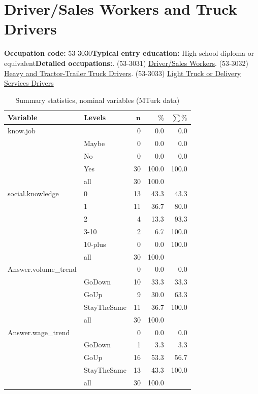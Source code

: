 \documentclass[a4paper,10pt]{article}\usepackage[]{graphicx}\usepackage[]{color}
\begin{document}
\newpage\section{Driver/Sales Workers and Truck Drivers}\textbf{Occupation code:} 53-3030\newline\textbf{Typical entry education:} High school diploma or equivalent\newline\textbf{Detailed occupations:}. (53-3031)  \href{http://www.bls.gov/oes/current/oes533031.htm}{Driver/Sales Workers}. (53-3032)  \href{http://www.bls.gov/oes/current/oes533032.htm}{Heavy and Tractor-Trailer Truck Drivers}. (53-3033)  \href{http://www.bls.gov/oes/current/oes533033.htm}{Light Truck or Delivery Services Drivers}\newline%
\begin{table}[ht]
\centering
{\footnotesize
\begin{tabular}{ll|rrr}
 \textbf{Variable} & \textbf{Levels} & $\mathbf{n}$ & $\mathbf{\%}$ & $\mathbf{\sum \%}$ \\ 
  \hline
know.job &  & 0 & 0.0 & 0.0 \\ 
   & Maybe & 0 & 0.0 & 0.0 \\ 
   & No & 0 & 0.0 & 0.0 \\ 
   & Yes & 30 & 100.0 & 100.0 \\ 
   \hline
 & all & 30 & 100.0 &  \\ 
   \hline
\hline
social.knowledge & 0 & 13 & 43.3 & 43.3 \\ 
   & 1 & 11 & 36.7 & 80.0 \\ 
   & 2 & 4 & 13.3 & 93.3 \\ 
   & 3-10 & 2 & 6.7 & 100.0 \\ 
   & 10-plus & 0 & 0.0 & 100.0 \\ 
   \hline
 & all & 30 & 100.0 &  \\ 
   \hline
\hline
Answer.volume\_trend &  & 0 & 0.0 & 0.0 \\ 
   & GoDown & 10 & 33.3 & 33.3 \\ 
   & GoUp & 9 & 30.0 & 63.3 \\ 
   & StayTheSame & 11 & 36.7 & 100.0 \\ 
   \hline
 & all & 30 & 100.0 &  \\ 
   \hline
\hline
Answer.wage\_trend &  & 0 & 0.0 & 0.0 \\ 
   & GoDown & 1 & 3.3 & 3.3 \\ 
   & GoUp & 16 & 53.3 & 56.7 \\ 
   & StayTheSame & 13 & 43.3 & 100.0 \\ 
   \hline
 & all & 30 & 100.0 &  \\ 
   \hline
\hline
\end{tabular}
}
\caption{Summary statistics, nominal variables (MTurk data)} 
\label{tab1:53-3030}
\end{table}
\end{document}
